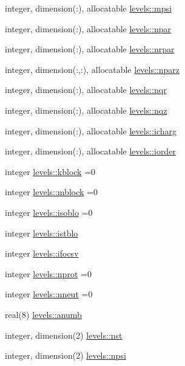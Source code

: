 \begin{DoxyCompactItemize}
\item 
integer, dimension(\+:), allocatable \hyperlink{namespacelevels_a465336b1dc5b723d1f54fb7361d8ed38}{levels\+::mpsi}
\item 
integer, dimension(\+:), allocatable \hyperlink{namespacelevels_a452a8212f6b718ac0f5e0809ca874e67}{levels\+::npar}
\item 
integer, dimension(\+:), allocatable \hyperlink{namespacelevels_a2c9b0cdf673a4c98cbe3f5742545e4b9}{levels\+::nrpar}
\item 
integer, dimension(\+:,\+:), allocatable \hyperlink{namespacelevels_a38ed4d213572f2840bd1bce5a2ec886a}{levels\+::nparz}
\item 
integer, dimension(\+:), allocatable \hyperlink{namespacelevels_a3a3fdd724fc4182517f3e6b94cd503ed}{levels\+::nqr}
\item 
integer, dimension(\+:), allocatable \hyperlink{namespacelevels_a7477bf7a01308e1450bd9b8b0a7b3b05}{levels\+::nqz}
\item 
integer, dimension(\+:), allocatable \hyperlink{namespacelevels_a6ed487575af304e88ec872c32a7cff19}{levels\+::icharg}
\item 
integer, dimension(\+:), allocatable \hyperlink{namespacelevels_a3b749ab6a1c4ad37dad493d3d91d7e04}{levels\+::iorder}
\item 
integer \hyperlink{namespacelevels_a4f8198007cbc95b2fb23ebf1d1f1c118}{levels\+::kblock} =0
\item 
integer \hyperlink{namespacelevels_a4ccc9103e54f31bb0cab356aa6beddb1}{levels\+::mblock} =0
\item 
integer \hyperlink{namespacelevels_ae193d65da90e45d3e2d7238422a5bfba}{levels\+::isoblo} =0
\item 
integer \hyperlink{namespacelevels_ad997f1af1ed619df7972aea27654aed0}{levels\+::istblo}
\item 
integer \hyperlink{namespacelevels_a7f6a832a14f8ccf0a880e041c9d9f166}{levels\+::ifocsv}
\item 
integer \hyperlink{namespacelevels_a07af295449db01b659290e9192db954f}{levels\+::nprot} =0
\item 
integer \hyperlink{namespacelevels_aa35279701a4ecc295c042671aa8ecceb}{levels\+::nneut} =0
\item 
real(8) \hyperlink{namespacelevels_a4d77a3334351c433fabe9af667519fab}{levels\+::anumb}
\item 
integer, dimension(2) \hyperlink{namespacelevels_ab8eb028f61bdfcc376968b23bacdb68f}{levels\+::nst}
\item 
integer, dimension(2) \hyperlink{namespacelevels_aa9870c52b50461dd864875bf5572da11}{levels\+::npsi}

\end{DoxyCompactItemize}

